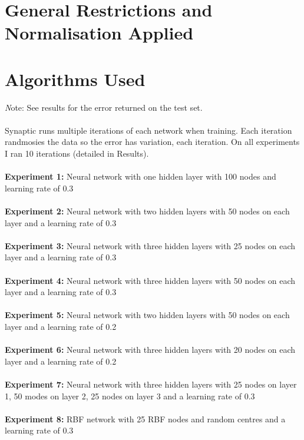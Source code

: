 \documentclass[11pt]{article}
\begin{document}
\begin{page}
\section{General Restrictions and Normalisation Applied}


\section{Algorithms Used}
\emph Note: See results for the error returned on the test set.\\\\
 
Synaptic runs multiple iterations of each network when training. Each iteration randmosies the data so the error has variation, each iteration. On all experiments I ran 10 iterations (detailed in Results).\\\\

\textbf{Experiment 1:} Neural network with one hidden layer with 100 nodes and learning rate of 0.3\\\\
\textbf{Experiment 2:} Neural network with two hidden layers with 50 nodes on each layer and a learning rate of 0.3\\\\
\textbf{Experiment 3:} Neural network with three hidden layers with 25 nodes on each layer and a learning rate of 0.3\\\\
\textbf{Experiment 4:} Neural network with three hidden layers with 50 nodes on each layer and a learning rate of 0.3\\\\
\textbf{Experiment 5:} Neural network with two hidden layers with 50 nodes on each layer and a learning rate of 0.2\\\\
\textbf{Experiment 6:} Neural network with three hidden layers with 20 nodes on each layer and a learning rate of 0.2\\\\
\textbf{Experiment 7:} Neural network with three hidden layers with 25 nodes on layer 1, 50 modes on layer 2, 25 nodes on layer 3 and a learning rate of 0.3\\\\
\textbf{Experiment 8:} RBF network with 25 RBF nodes and random centres and a learning rate of 0.3\\\\


\end{page}
\end{document}
